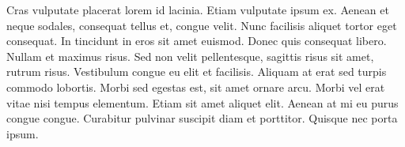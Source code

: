 \documentclass[11pt]{scrreprt}
\begin{document}
Cras vulputate placerat lorem id lacinia. Etiam vulputate ipsum ex. Aenean et neque sodales, consequat tellus et, congue velit. Nunc facilisis aliquet tortor eget consequat. In tincidunt in eros sit amet euismod. Donec quis consequat libero. Nullam et maximus risus. Sed non velit pellentesque, sagittis risus sit amet, rutrum risus. Vestibulum congue eu elit et facilisis. Aliquam at erat sed turpis commodo lobortis. Morbi sed egestas est, sit amet ornare arcu. Morbi vel erat vitae nisi tempus elementum. Etiam sit amet aliquet elit. Aenean at mi eu purus congue congue. Curabitur pulvinar suscipit diam et porttitor. Quisque nec porta ipsum. 
\end{document}
